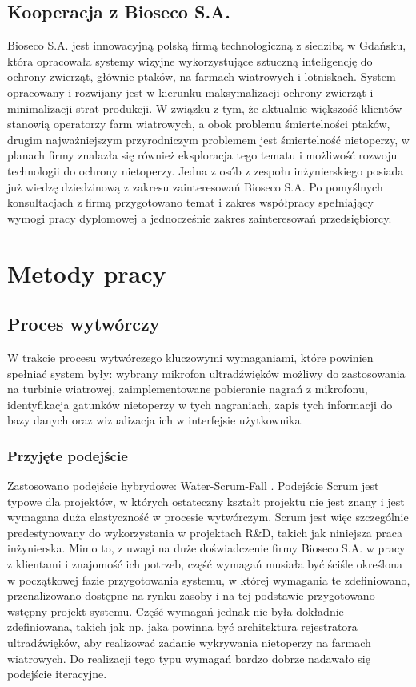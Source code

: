 \documentclass{sprz}
\begin{document}
\section{Kooperacja z Bioseco S.A.}
Bioseco S.A. jest innowacyjną polską firmą technologiczną z siedzibą w Gdańsku, która opracowała systemy wizyjne wykorzystujące sztuczną inteligencję do ochrony zwierząt, głównie ptaków, na farmach wiatrowych i lotniskach. System opracowany i rozwijany jest w kierunku maksymalizacji ochrony zwierząt i minimalizacji strat produkcji. W związku z tym, że aktualnie większość klientów stanowią operatorzy farm wiatrowych, a obok problemu śmiertelności ptaków, drugim najważniejszym przyrodniczym problemem jest śmiertelność nietoperzy, w planach firmy znalazła się również eksploracja tego tematu i możliwość rozwoju technologii do ochrony nietoperzy. Jedna z osób z zespołu inżynierskiego posiada już wiedzę dziedzinową z zakresu zainteresowań Bioseco S.A. Po pomyślnych konsultacjach z firmą przygotowano temat i zakres współpracy spełniający wymogi pracy dyplomowej a jednocześnie zakres zainteresowań przedsiębiorcy.

\chapter{Metody pracy}


\section{Proces wytwórczy}
W trakcie procesu wytwórczego kluczowymi wymaganiami, które powinien spełniać system były: wybrany mikrofon ultradźwięków możliwy do zastosowania na turbinie wiatrowej, zaimplementowane pobieranie nagrań z mikrofonu, identyfikacja gatunków nietoperzy w tych nagraniach, zapis tych informacji do bazy danych oraz wizualizacja ich w interfejsie użytkownika. 

\subsection{Przyjęte podejście}
Zastosowano podejście hybrydowe: Water-Scrum-Fall \cite{water-scrum-fall1} \cite{water-scrum-fall2} \cite{water-scrum-fall3}. Podejście Scrum jest typowe dla projektów, w których ostateczny kształt projektu nie jest znany i jest wymagana duża elastyczność w procesie wytwórczym. Scrum jest więc szczególnie predestynowany do wykorzystania w projektach R\&D, takich jak niniejsza praca inżynierska. Mimo to, z uwagi na duże doświadczenie firmy Bioseco S.A. w pracy z klientami i znajomość ich potrzeb, część wymagań musiała być ściśle określona w początkowej fazie przygotowania systemu, w której wymagania te zdefiniowano, przenalizowano dostępne na rynku zasoby i na tej podstawie przygotowano wstępny projekt systemu. Część wymagań jednak nie była dokładnie zdefiniowana, takich jak np. jaka powinna być architektura rejestratora ultradźwięków, aby realizować zadanie wykrywania nietoperzy na farmach wiatrowych. Do realizacji tego typu wymagań bardzo dobrze nadawało się podejście iteracyjne.
\end{document}
